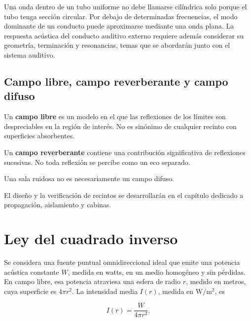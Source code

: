 Una onda dentro de un tubo uniforme no debe llamarse cilíndrica solo porque el
tubo tenga sección circular. Por debajo de determinadas frecuencias, el modo
dominante de un conducto puede aproximarse mediante una onda plana. La
respuesta acústica del conducto auditivo externo requiere además considerar su
geometría, terminación y resonancias, temas que se abordarán junto con el
sistema auditivo.

\subsection{Campo libre, campo reverberante y campo difuso}
\label{sec:u4-tipos-campo}

Un \textbf{campo libre} es un modelo en el que las reflexiones de los límites
son despreciables en la región de interés. No es sinónimo de cualquier recinto
con superficies absorbentes.

Un \textbf{campo reverberante} contiene una contribución significativa de
reflexiones sucesivas. No toda reflexión se percibe como un eco separado.

 Una sala ruidosa no es
necesariamente un campo difuso.

 El diseño y la
verificación de recintos se desarrollarán en el capítulo dedicado a
propagación, aislamiento y cabinas.

\section{Ley del cuadrado inverso}
\label{sec:u4-cuadrado-inverso}

Se considera una fuente puntual omnidireccional ideal que emite una potencia
acústica constante \(W\), medida en watts, en un medio homogéneo y sin pérdidas.
En campo libre, esa potencia atraviesa una esfera de radio \(r\), medido en
metros, cuya superficie es \(4\pi r^2\). La intensidad media \(I(r)\), medida
en \(\text{W}/\text{m}^2\), es

\begin{equation}
    I(r)=\frac{W}{4\pi r^2}.
    \label{eq:u4-cuadrado-inverso}
\end{equation}

